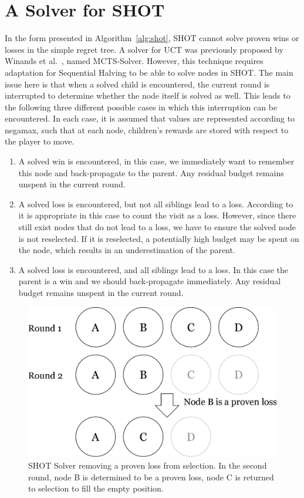 \documentclass{icga}
\begin{document}
\section{A Solver for SHOT}
\label{sec:shotsolver}

In the form presented in Algorithm~\ref{alg:shot}, SHOT cannot solve proven wins or losses in the simple regret tree. A solver for UCT was previously proposed by Winands et al.~, named MCTS-Solver. However, this technique requires adaptation for Sequential Halving to be able to solve nodes in SHOT. The main issue here is that when a solved child is encountered, the current round is interrupted to determine whether the node itself is solved as well. This leads to the following three different possible cases in which this interruption can be encountered. In each case, it is assumed that values are represented according to negamax, such that at each node, children's rewards are stored with respect to the player to move.
\begin{enumerate}
\item A solved win is encountered, in this case, we immediately want to remember this node and back-propagate to the parent. Any residual budget remains unspent in the current round.
\item A solved loss is encountered, but not all siblings lead to a loss. According to~ it is appropriate in this case to count the visit as a loss. However, since there still exist nodes that do not lead to a loss, we have to ensure the solved node is not reselected. If it is reselected, a potentially high budget may be spent on the node, which results in an underestimation of the parent.
\item A solved loss is encountered, and all siblings lead to a loss. In this case the parent is a win and we should back-propagate immediately. Any residual budget remains unspent in the current round.
\end{enumerate}
\begin{figure}[hb]
	\centering
	\includegraphics[width=.6\textwidth]{img/solver.png}
	\caption[SHOT Solver example]{SHOT Solver removing a proven loss from selection. In the second round, node B is determined to be a proven loss, node C is returned to selection to fill the empty position.}
	\label{fig:shot_solver}
\end{figure}
\end{document}

